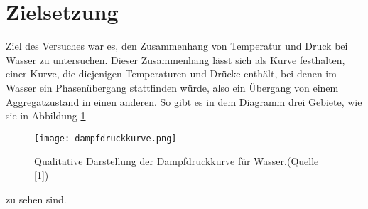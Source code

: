 \section{Zielsetzung}
Ziel des Versuches war es, den Zusammenhang von Temperatur und Druck bei Wasser 
zu untersuchen. Dieser Zusammenhang lässt sich als Kurve festhalten,
einer Kurve, die diejenigen Temperaturen und Drücke enthält, bei denen im Wasser
ein Phasenübergang stattfinden würde, also ein Übergang von einem Aggregatzustand
in einen anderen. So gibt es in dem Diagramm drei Gebiete, wie sie in Abbildung \ref{fig:kurve}
\begin{figure}
    \centering
    \texttt{[image: dampfdruckkurve.png]}
    \caption{Qualitative Darstellung der Dampfdruckkurve für Wasser.(Quelle [1])}
    \label{fig:kurve}
\end{figure}
zu sehen sind. \\